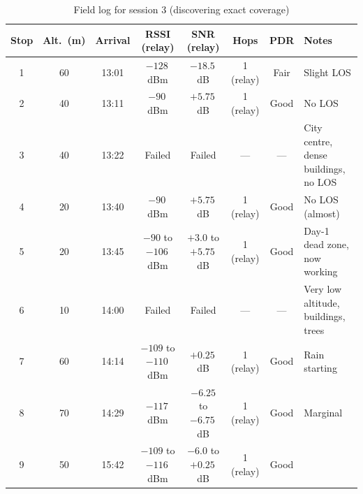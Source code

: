 \begin{table}[h]
  \centering
  \tiny
  \begin{tabular}{cccccccl}
    \toprule
    \textbf{Stop} & \textbf{Alt.\ (m)} & \textbf{Arrival} & \textbf{RSSI (relay)} & \textbf{SNR (relay)} & \textbf{Hops} & \textbf{PDR} & \textbf{Notes} \\
    \midrule
    1 & 60 & 13:01 & $-128$\,dBm & $-18.5$\,dB  & 1 (relay) & Fair   & Slight LOS \\
    2 & 40 & 13:11 & $-90$\,dBm  & $+5.75$\,dB  & 1 (relay) & Good   & No LOS \\
    3 & 40 & 13:22 & Failed      & Failed       & ---       & ---    & City centre, dense buildings, no LOS \\
    4 & 20 & 13:40 & $-90$\,dBm  & $+5.75$\,dB  & 1 (relay) & Good   & No LOS (almost) \\
    5 & 20 & 13:45 & $-90$ to $-106$\,dBm & $+3.0$ to $+5.75$\,dB & 1 (relay) & Good & Day-1 dead zone, now working \\
    6 & 10 & 14:00 & Failed      & Failed       & ---       & ---    & Very low altitude, buildings, trees \\
    7 & 60 & 14:14 & $-109$ to $-110$\,dBm & $+0.25$\,dB & 1 (relay) & Good & Rain starting \\
    8 & 70 & 14:29 & $-117$\,dBm & $-6.25$ to $-6.75$\,dB & 1 (relay) & Good & Marginal \\
    9 & 50 & 15:42 & $-109$ to $-116$\,dBm & $-6.0$ to $+0.25$\,dB & 1 (relay) & Good & \\
    \bottomrule
  \end{tabular}
  \caption[Session 3]{\label{tab:bijlage-session3}Field log for session 3 (discovering exact coverage)}
\end{table}